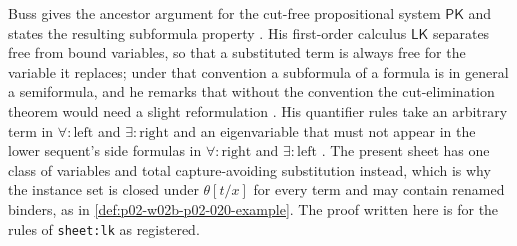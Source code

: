 Buss gives the ancestor argument for the cut-free propositional system
\(\mathsf{PK}\) and states the resulting subformula property
\cite[\S1.2.3, p.~12, and Prop.~1.2.4, p.~13]{Buss1998Intro}.  His first-order
calculus \(\mathsf{LK}\) separates free from bound variables, so that a
substituted term is always free for the variable it replaces; under that
convention a subformula of a formula is in general a semiformula, and he
remarks that without the convention the cut-elimination theorem would need a
slight reformulation \cite[\S2.3.1, pp.~31--32]{Buss1998Intro}.  His
quantifier rules take an arbitrary term in \(\forall{:}\mathrm{left}\) and
\(\exists{:}\mathrm{right}\) and an eigenvariable that must not appear in the
lower sequent's side formulas in \(\forall{:}\mathrm{right}\) and
\(\exists{:}\mathrm{left}\) \cite[Def.~2.3.2, p.~32]{Buss1998Intro}.  The
present sheet has one class of variables and total capture-avoiding
substitution instead, which is why the instance set is closed under
\(\theta[t/x]\) for every term and may contain renamed binders, as in
\cref{def:p02-w02b-p02-020-example}.  The proof written here is for the rules
of \texttt{sheet:lk} as registered.
